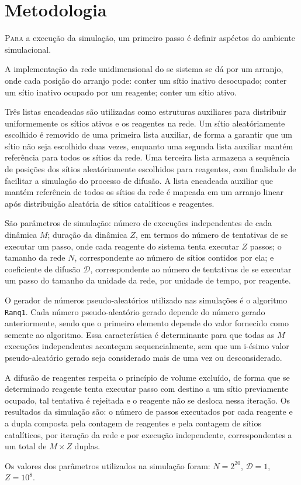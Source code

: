 
\section{Metodologia}

\lettrine{P}{ara} a execução da simulação, um primeiro passo é definir aspéctos do ambiente
simulacional.

A implementação da rede unidimensional do se sistema se dá por um arranjo, onde
cada posição do arranjo pode: conter um sítio inativo desocupado; conter um
sítio inativo ocupado por um reagente; conter um sítio ativo.

Três listas encadeadas são utilizadas como estruturas auxiliares para
distribuir uniformemente os sítios ativos e os reagentes na rede. Um sítio
aleatóriamente escolhido é removido de uma primeira lista auxiliar, de forma a
garantir que um sítio não seja escolhido duas vezes, enquanto uma segunda lista
auxiliar mantém referência para todos os sítios da rede. Uma terceira lista
armazena a sequência de posições dos sítios aleatóriamente escolhidos para
reagentes, com finalidade de facilitar a simulação do processo de difusão. A
lista encadeada auxiliar que mantém referência de todos os sítios da rede é
mapeada em um arranjo linear após distribuição aleatória de sítios catalíticos e
reagentes.

São parâmetros de simulação: número de execuções independentes de cada dinâmica
$M$; duração da dinâmica $Z$, em termos do número de tentativas de se executar
um passo, onde cada reagente do sistema tenta executar $Z$ passos; o tamanho da
rede $N$, correspondente ao número de sítios contidos por ela; e coeficiente de
difusão $\mathcal{D}$, correspondente ao número de tentativas de se executar um
passo do tamanho da unidade da rede, por unidade de tempo, por reagente.

O gerador de números pseudo-aleatórios utilizado nas simulações é o algoritmo
\texttt{Ranq1}\cite{8}. Cada número pseudo-aleatório gerado depende do número
gerado anteriormente, sendo que o primeiro elemento depende do valor fornecido
como semente ao algoritmo. Essa característica é determinante para que todas as
$M$ execuções independentes aconteçam sequencialmente, sem que um i-ésimo valor
pseudo-aleatório gerado seja considerado mais de uma vez ou desconsiderado.

A difusão de reagentes respeita o princípio de volume excluído, de forma que se
determinado reagente tenta executar passo com destino a um sítio previamente
ocupado, tal tentativa é rejeitada e o reagente não se desloca nessa iteração.
Os resultados da simulação são: o número de passos executados por cada reagente
e a dupla composta pela contagem de reagentes e pela contagem de sítios
catalíticos, por iteração da rede e por execução independente, correspondentes a
um total de $M \times Z$ duplas.

Os valores dos parâmetros utilizados na simulação foram: $N = 2^{20}$,
$\mathcal{D} = 1$, $Z = 10^8$.
